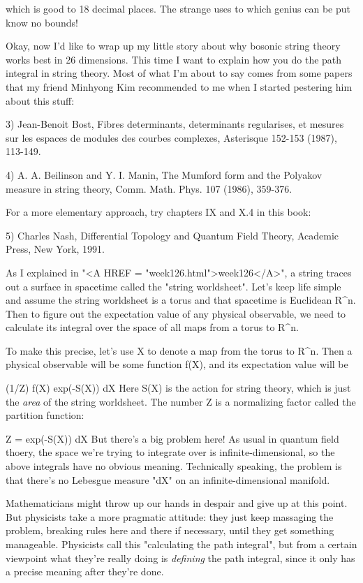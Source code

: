 which is good to 18 decimal places.  The strange uses to which genius
can be put know no bounds!  

Okay, now I'd like to wrap up my little story about why bosonic string
theory works best in 26 dimensions.  This time I want to explain how
you do the path integral in string theory.  Most of what I'm about to
say comes from some papers that my friend Minhyong Kim recommended 
to me when I started pestering him about this stuff:

3) Jean-Benoit Bost, Fibres determinants, determinants regularises, et
mesures sur les espaces de modules des courbes complexes, Asterisque
152-153 (1987), 113-149.

4) A. A. Beilinson and Y. I. Manin, The Mumford form and the Polyakov 
measure in string theory, Comm. Math. Phys. 107 (1986), 359-376.

For a more elementary approach, try chapters IX and X.4 in this book:

5) Charles Nash, Differential Topology and Quantum Field Theory, 
Academic Press, New York, 1991.


As I explained in "<A HREF = "week126.html">week126</A>", a
string traces out a surface in spacetime called the "string
worldsheet".  Let's keep life simple and assume the string
worldsheet is a torus and that spacetime is Euclidean R^{n}.
Then to figure out the expectation value of any physical observable, we
need to calculate its integral over the space of all maps from a torus
to R^{n}.


To make this precise, let's use X to denote a map from the torus to
R^{n}.  Then a physical observable will be some function f(X),
and its expectation value will be

                   (1/Z) \int  f(X) exp(-S(X)) dX
Here S(X) is the action for string theory, which is just the \emph{area} of 
the string worldsheet.  The number Z is a normalizing factor called the
partition function: 

                     Z = \int  exp(-S(X)) dX
But there's a big problem here!  As usual in quantum field thoery, the
space we're trying to integrate over is infinite-dimensional, so the
above integrals have no obvious meaning.  Technically speaking, the
problem is that there's no Lebesgue measure "dX" on an
infinite-dimensional manifold. 

Mathematicians might throw up our hands in despair and give up at this
point.  But physicists take a more pragmatic attitude: they just keep
massaging the problem, breaking rules here and there if necessary, until
they get something manageable.   Physicists call this "calculating the
path integral", but from a certain viewpoint what they're really doing
is \emph{defining} the path integral, since it only has a precise meaning
after they're done.  

